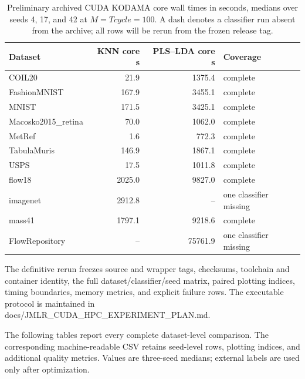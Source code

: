 \documentclass[twoside,11pt]{article}
\begin{document}
\begin{small}
\begin{table}[h]
\caption{Preliminary archived CUDA KODAMA core wall times in seconds, medians over seeds 4, 17, and 42 at $M=Tcycle=100$. A dash denotes a classifier run absent from the archive; all rows will be rerun from the frozen release tag.}
\centering\small
\begin{tabular}{lrrl}
\toprule
Dataset & KNN core s & PLS--LDA core s & Coverage \\
\midrule
COIL20 & 21.9 & 1375.4 & complete \\
FashionMNIST & 167.9 & 3455.1 & complete \\
MNIST & 171.5 & 3425.1 & complete \\
Macosko2015\_retina & 70.0 & 1062.0 & complete \\
MetRef & 1.6 & 772.3 & complete \\
TabulaMuris & 146.9 & 1867.1 & complete \\
USPS & 17.5 & 1011.8 & complete \\
flow18 & 2025.0 & 9827.0 & complete \\
imagenet & 2912.8 & -- & one classifier missing \\
mass41 & 1797.1 & 9218.6 & complete \\
FlowRepository & -- & 75761.9 & one classifier missing \\
\bottomrule
\end{tabular}
\end{table}

The definitive rerun freezes source and wrapper tags, checksums, toolchain and container identity, the full dataset/classifier/seed matrix, paired plotting indices, timing boundaries, memory metrics, and explicit failure rows. The executable protocol is maintained in docs/JMLR\_CUDA\_HPC\_EXPERIMENT\_PLAN.md.

The following tables report every complete dataset-level comparison. The corresponding machine-readable CSV retains seed-level rows, plotting indices, and additional quality metrics. Values are three-seed medians; external labels are used only after optimization.


\end{small}
\end{document}
